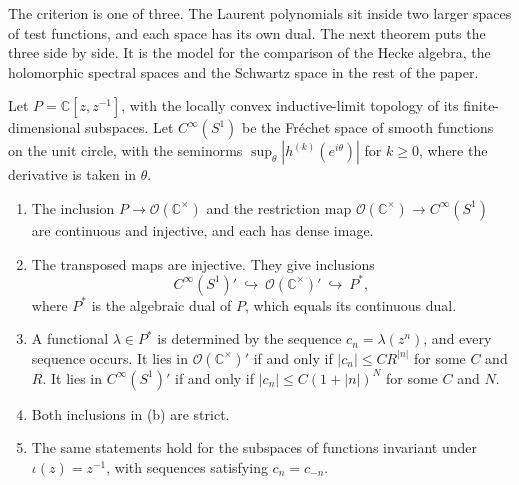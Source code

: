 The criterion is one of three. The Laurent polynomials sit inside two larger spaces of test functions, and each space has its own dual. The next theorem puts the three side by side. It is the model for the comparison of the Hecke algebra, the holomorphic spectral spaces and the Schwartz space in the rest of the paper.

Let $P=\mathbb C[z,z^{-1}]$, with the locally convex inductive-limit topology of its finite-dimensional subspaces. Let $C^\infty(S^1)$ be the Fr\'echet space of smooth functions on the unit circle, with the seminorms $\sup_\theta|h^{(k)}(e^{i\theta})|$ for $k\ge0$, where the derivative is taken in $\theta$.

\begin{theorem}\label{thm:three-duals}
\begin{enumerate}[label=(\alph*),leftmargin=*]
\item The inclusion $P\to\mathcal O(\mathbb C^\times)$ and the restriction map $\mathcal O(\mathbb C^\times)\to C^\infty(S^1)$ are continuous and injective, and each has dense image.
\item The transposed maps are injective. They give inclusions
\[
C^\infty(S^1)'\ \hookrightarrow\ \mathcal O(\mathbb C^\times)'\ \hookrightarrow\ P^*,
\]
where $P^*$ is the algebraic dual of $P$, which equals its continuous dual.
\item A functional $\lambda\in P^*$ is determined by the sequence $c_n=\lambda(z^n)$, and every sequence occurs. It lies in $\mathcal O(\mathbb C^\times)'$ if and only if $|c_n|\le CR^{|n|}$ for some $C$ and $R$. It lies in $C^\infty(S^1)'$ if and only if $|c_n|\le C(1+|n|)^N$ for some $C$ and $N$.
\item Both inclusions in (b) are strict.
\item The same statements hold for the subspaces of functions invariant under $\iota(z)=z^{-1}$, with sequences satisfying $c_n=c_{-n}$.
\end{enumerate}
\end{theorem}
